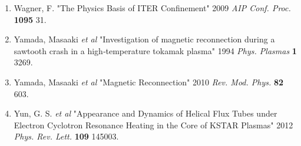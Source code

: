 \documentclass{article}
\begin{document}
\begin{enumerate}
\item Wagner, F. "The Physics Basis of ITER Confinement" 2009 \textit{AIP Conf. Proc.} \textbf{1095} 31.
\item Yamada, Masaaki \textit{et al} "Investigation of magnetic reconnection during a sawtooth crash in a high‐temperature tokamak plasma" 1994 \textit{Phys. Plasmas} \textbf{1} 3269.
\item Yamada, Masaaki \textit{et al} "Magnetic Reconnection" 2010 \textit{Rev. Mod. Phys.} \textbf{82} 603.
\item Yun, G. S. \textit{et al} "Appearance and Dynamics of Helical Flux Tubes under Electron Cyclotron Resonance Heating in the Core of KSTAR Plasmas" 2012 \textit{Phys. Rev. Lett.} \textbf{109} 145003.
\end{enumerate}
\end{document}
